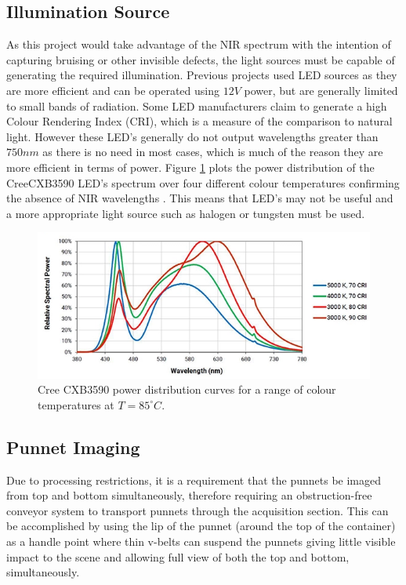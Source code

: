 \documentclass[fleqn,twoside,12pt]{report}
\begin{document}
\subsection{Illumination Source}

As this project would take advantage of the NIR spectrum with the intention of capturing bruising or other invisible defects, the light sources must be capable of generating the required illumination. Previous projects used LED sources as they are more efficient and can be operated using $12V$ power, but are generally limited to small bands of radiation. Some LED manufacturers claim to generate a high Colour Rendering Index (CRI), which is a measure of the comparison to natural light. However these LED's generally do not output wavelengths greater than $750nm$ as there is no need in most cases, which is much of the reason they are more efficient in terms of power. Figure \ref{fig:LED_response} plots the power distribution of the Cree\textregistered CXB3590 LED's spectrum over four different colour temperatures confirming the absence of NIR wavelengths \cite{led_power}. This means that LED's may not be useful and a more appropriate light source such as halogen or tungsten must be used.


\begin{figure}[h]
	\centering
	\includegraphics[width=.9\linewidth]{LED_response.png}
	\caption{Cree CXB3590 power distribution curves for a range of colour temperatures at $T=85^{\circ}C$.}
	\label{fig:LED_response}
\end{figure}%





\subsection{Punnet Imaging}

Due to processing restrictions, it is a requirement that the punnets be imaged from top and bottom simultaneously, therefore requiring an obstruction-free conveyor system to transport punnets through the acquisition section. This can be accomplished by using the lip of the punnet (around the top of the container) as a handle point where thin v-belts can suspend the punnets giving little visible impact to the scene and allowing full view of both the top and bottom, simultaneously.
\end{document}

